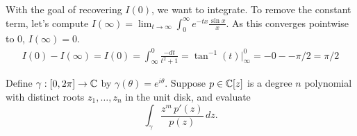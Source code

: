 \documentclass{homework}
\begin{document}
\begin{solution}
\[                                                                        \]
                                                                        With the goal of recovering $I(0)$, we want to integrate. To remove the constant term, let's compute $I(\infty) = \lim_{t\to\infty} \int_0^\infty e^{-tx}\frac{\sin x}{x}$. As this converges pointwise to 0, $I(\infty) = 0$.
                                                                        \begin{align*}
                                                                        I(0) - I(\infty) = I(0) = \int_\infty^0 \frac{-dt}{t^2 + 1} = \tan^{-1}(t)\big|_\infty^0 = -0 - -\pi/2 = \pi/2
                                                                        \end{align*}
                                                                        \end{solution}
                                                                        \begin{problem}
                                                                          Define $\gamma : [0,2\pi] \to \mathbb{C}$ by $\gamma(\theta) = e^{i\theta}$.
                                                                            Suppose $p \in \mathbb{C}[z]$ is a degree $n$ polynomial with distinct roots
                                                                              $z_1,\ldots,z_n$ in the unit disk, and evaluate
                                                                                \[
                                                                                    \int_\gamma \frac{z^m \, p'(z)}{p(z)} \, dz.
                                                                                      \]
                                                                                      \end{problem}
\end{document}
